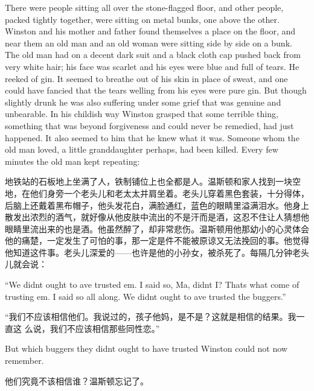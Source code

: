 \begin{paracol}{2}
There were people sitting all over the stone-flagged floor, and other
people, packed tightly together, were sitting on metal bunks, one above
the other. Winston and his mother and father found themselves a place on
the floor, and near them an old man and an old woman were sitting side
by side on a bunk. The old man had on a decent dark suit and a black
cloth cap pushed back from very white hair; his face was scarlet and his
eyes were blue and full of tears. He reeked of gin. It seemed to breathe
out of his skin in place of sweat, and one could have fancied that the
tears welling from his eyes were pure gin. But though slightly drunk he
was also suffering under some grief that was genuine and unbearable. In
his childish way Winston grasped that some terrible thing, something
that was beyond forgiveness and could never be remedied, had just
happened. It also seemed to him that he knew what it was. Someone whom
the old man loved, a little granddaughter perhaps, had been killed.
Every few minutes the old man kept repeating:

\switchcolumn

地铁站的石板地上坐满了人，铁制铺位上也全都是人。温斯顿和家人找到一块空地，在他们身旁一个老头儿和老太太并肩坐着。老头儿穿着黑色套装，十分得体，后脑上还戴着黑布帽子，他头发花白，满脸通红，蓝色的眼睛里溢满泪水。他身上散发出浓烈的酒气，就好像从他皮肤中流出的不是汗而是酒，这忍不住让人猜想他眼睛里流出来的也是酒。他虽然醉了，却非常悲伤。温斯顿用他那幼小的心灵体会他的痛楚，一定发生了可怕的事，那一定是件不能被原谅又无法挽回的事。他觉得他知道这件事。老头儿深爱的——也许是他的小孙女，被杀死了。每隔几分钟老头儿就会说：

\switchcolumn*

``We didn\textquotesingle t ought to \textquotesingle ave trusted
\textquotesingle em. I said so, Ma, didn\textquotesingle t I?
That\textquotesingle s what come of trusting \textquotesingle em. I said
so all along. We didn\textquotesingle t ought to \textquotesingle ave
trusted the buggers.''

\switchcolumn

``我们不应该相信他们。我说过的，孩子他妈，是不是？这就是相信的结果。我一直这
么说，我们不应该相信那些同性恋。''

\switchcolumn*

But which buggers they didn\textquotesingle t ought to have trusted
Winston could not now remember.

\switchcolumn

他们究竟不该相信谁？温斯顿忘记了。


\end{paracol}
